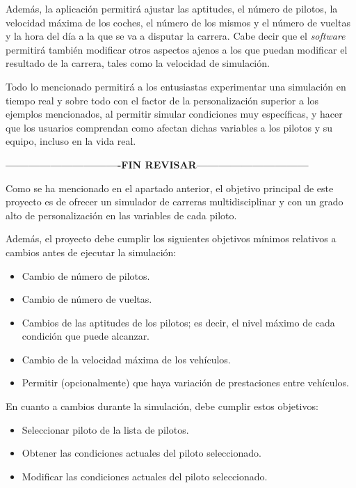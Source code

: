 \documentclass[a4paper,11pt]{book}
\begin{document}
\bigskip

Además, la aplicación permitirá ajustar las aptitudes, el número de pilotos, la velocidad máxima de los coches, el número de los mismos y el número de vueltas y la hora del día a la que se va a disputar la carrera. Cabe decir que el \textit{software} permitirá también modificar otros aspectos ajenos a los que puedan modificar el resultado de la carrera, tales como la velocidad de simulación.

\bigskip

Todo lo mencionado permitirá a los entusiastas experimentar una simulación en tiempo real y sobre todo con el factor de la personalización superior a los ejemplos mencionados, al permitir simular condiciones muy específicas, y hacer que los usuarios comprendan como afectan dichas variables a los pilotos y su equipo, incluso en la vida real.

\textbf{-------------------------------FIN REVISAR------------------------------}

Como se ha mencionado en el apartado anterior, el objetivo principal de este proyecto es de ofrecer un simulador de carreras multidisciplinar y con un grado alto de personalización en las variables de cada piloto.

\bigskip

Además, el proyecto debe cumplir los siguientes objetivos mínimos relativos a cambios antes de ejecutar la simulación:

\begin{itemize}
   \item Cambio de número de pilotos.
   \item Cambio de número de vueltas.
   \item Cambios de las aptitudes de los pilotos; es decir, el nivel máximo de cada condición que puede alcanzar.
   \item Cambio de la velocidad máxima de los vehículos.
   \item Permitir (opcionalmente) que haya variación de prestaciones entre vehículos.
\end{itemize}

\bigskip

En cuanto a cambios durante la simulación, debe cumplir estos objetivos:

\begin{itemize}
   \item Seleccionar piloto de la lista de pilotos.
   \item Obtener las condiciones actuales del piloto seleccionado.
   \item Modificar las condiciones actuales del piloto seleccionado.
\end{itemize}
\end{document}
